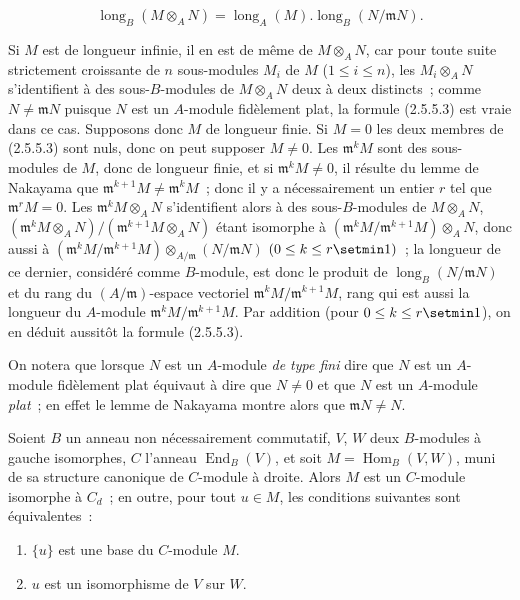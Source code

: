 \begin{env}[2.5.5.3]
\label{IV.2.5.5.3-fr}
\[
\operatorname{long}_B(M\otimes_A N)
=\operatorname{long}_A(M).
 \operatorname{long}_B(N/\mathfrak mN).
\]
\end{env}

Si $M$ est de longueur infinie, il en est de même de $M\otimes_A N$, car
pour toute suite strictement croissante de $n$ sous-modules $M_i$ de $M$
($1\leq i\leq n$), les $M_i\otimes_A N$ s'identifient à des sous-$B$-modules
de $M\otimes_A N$ deux à deux distincts~; comme
$N\ne\mathfrak mN$ puisque $N$ est un $A$-module fidèlement plat, la formule
(2.5.5.3) est vraie dans ce cas. Supposons donc $M$ de longueur finie. Si
$M=0$ les deux membres de (2.5.5.3) sont nuls, donc on peut supposer
$M\ne0$. Les $\mathfrak m^kM$ sont des sous-modules de $M$, donc de longueur
finie, et si $\mathfrak m^kM\ne0$, il résulte du lemme de Nakayama que
$\mathfrak m^{k+1}M\ne\mathfrak m^kM$~; donc il y a nécessairement un entier
$r$ tel que $\mathfrak m^rM=0$. Les
$\mathfrak m^kM\otimes_A N$ s'identifient alors à des sous-$B$-modules de
$M\otimes_A N$,
$(\mathfrak m^kM\otimes_A N)/(\mathfrak m^{k+1}M\otimes_A N)$
étant isomorphe à
$(\mathfrak m^kM/\mathfrak m^{k+1}M)\otimes_A N$,
donc aussi à
$(\mathfrak m^kM/\mathfrak m^{k+1}M)
\otimes_{A/\mathfrak m}(N/\mathfrak mN)$
$(0\leq k\leq r\setmin 1)$~;
la longueur de ce dernier, considéré comme $B$-module, est donc le produit de
$\operatorname{long}_B(N/\mathfrak mN)$ et du rang du
$(A/\mathfrak m)$-espace vectoriel
$\mathfrak m^kM/\mathfrak m^{k+1}M$, rang qui est aussi la longueur du
$A$-module $\mathfrak m^kM/\mathfrak m^{k+1}M$. Par addition (pour
$0\leq k\leq r\setmin 1$), on en déduit aussitôt la formule (2.5.5.3).

\begin{remark}[2.5.5.4]
\label{IV.2.5.5.4-fr}
On notera que lorsque $N$ est un $A$-module \emph{de type fini} dire que $N$
est un $A$-module fidèlement plat équivaut à dire que $N\ne0$ et que $N$ est
un $A$-module \emph{plat}~; en effet le lemme de Nakayama montre alors que
$\mathfrak mN\ne N$.
\end{remark}

\begin{lemma}[2.5.6]
\label{IV.2.5.6-fr}
Soient $B$ un anneau non nécessairement commutatif, $V$, $W$ deux
$B$-modules à gauche isomorphes, $C$ l'anneau
$\operatorname{End}_B(V)$, et soit
$M=\operatorname{Hom}_B(V,W)$, muni de sa structure canonique de
$C$-module à droite. Alors $M$ est un $C$-module isomorphe à $C_d$~; en
outre, pour tout $u\in M$, les conditions suivantes sont équivalentes~:
\begin{enumerate}
\item[\emph{a)}] $\{u\}$ est une base du $C$-module $M$.
\item[\emph{b)}] $u$ est un isomorphisme de $V$ sur $W$.
\end{enumerate}
\end{lemma}

